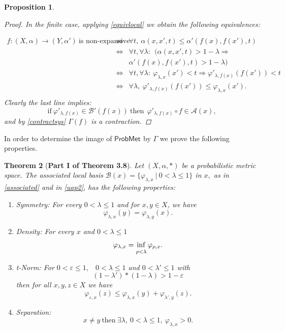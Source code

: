 \documentclass[12pt,a4paper]{amsart}
\theoremstyle{theorem}
\newtheorem{theorem}{Theorem}[section]
\newtheorem{proposition}[theorem]{Proposition}
\theoremstyle{definition}
\newcommand{\aaa}{\ensuremath{\mathcal{A}}}
\newcommand{\bbb}{\ensuremath{\mathcal{B}}}
\newcommand{\PM}{\ensuremath{\mathsf{ProbMet_{}}}}
\renewcommand{\inf}{\myinf}
\DeclareMathOperator*{\myinf}{in\vphantom{p}f}
\renewcommand{\a}{\ensuremath{\alpha}}
\newcommand{\ve}{\ensuremath{\varepsilon}}
\renewcommand{\l}{\ensuremath{\lambda}}
\def\rw{\rightarrow}
\begin{document}
{\begin{proposition}
\begin{proof}
 In the finite case, applying \eqref{equivlocal} we obtain the following equivalences:
 
 \begin{eqnarray*}
  f: (X,\a) \rw (Y, \a')\  \text{is non-expansive} \ &\Leftrightarrow & \forall t, \ \a(x,x',t) \leq \a'(f(x), f(x'), t )\\
&\Leftrightarrow& \forall t, \forall \l : \ \ (\a(x,x', t) > 1 - \l  \Rightarrow\\
&& \a'(f(x), f(x') , t) > 1 - \l )\\
&\Leftrightarrow& \forall t,  \forall \l :  \  \varphi_{\l,x} (x') < t \Rightarrow \varphi ' _{\l, f(x)} (f(x')) < t\\
&\Leftrightarrow& \forall \l, \  \varphi'_{\l,f(x)} (f(x')) \leq \varphi _{\l,x} (x').\\
\end{eqnarray*}
Clearly the last line implies:
$$
\text{if} 
\  \varphi' _{\l, f(x)} \in \bbb'(f(x))\   \text{then}\ \ \varphi'_{\l, f(x)} \circ f \in \aaa(x),
$$
and by \eqref{contractsys} $\Gamma(f)$ is a contraction.
\end{proof}
\end{proposition}

In order to determine the image of $\PM$ by $\Gamma$ we prove the following properties.




\begin{theorem}[\bf Part I of Theorem 3.8]\label{char}
 Let $(X,\a,*)$ be a probabilistic metric space. The associated local basis $\bbb(x) = \{ \varphi_{\l,x} \ | \ 0 < \l \leq 1 \} $ in $x,$ as in \eqref{associated} and 
 in \ref{uap2}, has the following properties:
\begin{enumerate}
\item [\bf{(LS)}] Symmetry: For every $0 < \l \leq 1$ and for $x,y \in X$, we have 
$$\varphi_{\l,x} (y) = \varphi _{\l,y} (x).$$
\item [\bf{(LD)}] Density:  For every $x$ and $0 < \l \leq 1$ 
$$
\varphi_{\l,x} = \inf _{\rho < \l} \varphi_{\rho,x}.
$$ 
\item[\bf{(LT)}] t-Norm: For $0 < \ve \leq 1,$ \  $0 < \l \leq 1$ and $0 < \l' \leq 1$
with
$$
 (1 - \l') * ( 1 - \l) > 1- \ve
$$
then for all $x,y,z \in X$ we have
$$
\varphi_{\ve,x} (z) \leq \varphi _{\l, x} (y) + \varphi _{\l', y} (z).
$$
\item [\bf{(LH)}] Separation:
$$
x \not = y \ \text{then} \  \exists\l, \  0 < \l \leq 1, \ \varphi_{ \l,x} > 0.
$$
\end{enumerate}


\end{theorem}}
\end{document}
